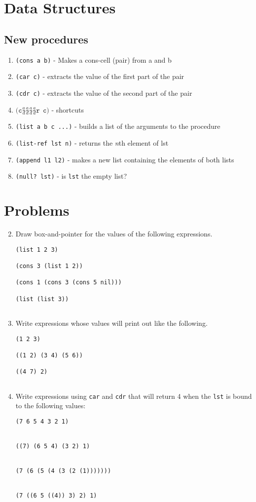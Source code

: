 \section*{Data Structures}

\subsection*{New procedures}
\begin{enumerate}
\item {\tt (cons a b)} - Makes a cons-cell (pair) from a and b
\item {\tt (car c)} - extracts the value of the first part of the pair
\item {\tt (cdr c)} - extracts the value of the second part of the pair
\item $\mathtt{(c}\frac{a}{d}\frac{a}{d}\frac{a}{d}\frac{a}{d}\mathtt{r\ \ c)}$ - shortcuts
\item {\tt (list a b c ...)} - builds a list of the arguments to the procedure
\item {\tt (list-ref lst n)} - returns the {\it n}th element of lst
\item {\tt (append l1 l2)} - makes a new list containing the elements of both lists
\item {\tt (null? lst)} - is {\tt lst} the empty list?
\end{enumerate}

\section*{Problems}

\begin{enumerate}
\setcounter{enumi}{1}
\item Draw box-and-pointer for the values of the following expressions.
\begin{verbatim}
(list 1 2 3)

(cons 3 (list 1 2))

(cons 1 (cons 3 (cons 5 nil)))

(list (list 3))


\end{verbatim}

\item Write expressions whose values will print out like the
following.
\begin{verbatim}
(1 2 3)

((1 2) (3 4) (5 6))

((4 7) 2)


\end{verbatim}

\item Write expressions using {\tt car} and {\tt cdr} that will return
4 when the {\tt lst} is bound to the following values:
\begin{verbatim}
(7 6 5 4 3 2 1)


((7) (6 5 4) (3 2) 1)


(7 (6 (5 (4 (3 (2 (1)))))))


(7 ((6 5 ((4)) 3) 2) 1)


\end{verbatim}

\end{enumerate}


